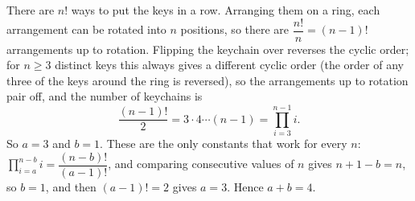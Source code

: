 There are $n!$ ways to put the keys in a row. Arranging them on a ring, each arrangement can be rotated into $n$ positions, so there are $\dfrac{n!}{n}=(n-1)!$ arrangements up to rotation. Flipping the keychain over reverses the cyclic order; for $n\ge3$ distinct keys this always gives a different cyclic order (the order of any three of the keys around the ring is reversed), so the arrangements up to rotation pair off, and the number of keychains is
\[\dfrac{(n-1)!}{2}=3\cdot4\cdots(n-1)=\prod_{i=3}^{n-1}i .\]
So $a=3$ and $b=1$. These are the only constants that work for every $n$: $\prod_{i=a}^{n-b}i=\dfrac{(n-b)!}{(a-1)!}$, and comparing consecutive values of $n$ gives $n+1-b=n$, so $b=1$, and then $(a-1)!=2$ gives $a=3$. Hence $a+b=\boxed{4}$.
